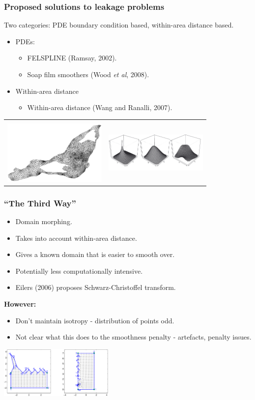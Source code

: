 \documentclass[ignorenonframetext]{beamer} %
\newcommand{\bc}{\begin{center}}
\newcommand{\ec}{\end{center}}
\newcommand{\bi}{\begin{itemize}}
\newcommand{\ei}{\end{itemize}}
\begin{document}
\begin{frame}
	\frametitle{Proposed solutions to leakage problems}
	Two categories: PDE boundary condition based, within-area distance based.
       \bi
         \item PDEs:
	  \bi
             \item FELSPLINE (Ramsay, 2002).
             \item Soap film smoothers (Wood \emph{et al}, 2008).
           \ei
           \item Within-area distance
           \bi
             \item Within-area distance (Wang and Ranalli, 2007).
           \ei
        \ei
        \bc\begin{tabular}{@{}cc}
          & \\
        \includegraphics[width=2in]{figs/ramsaytriangulation.png}&\includegraphics[width=2in]{figs/soapbases.png}\\
        \end{tabular}
        \ec
\end{frame}


\begin{frame}
	\frametitle{``The Third Way''}
      \bi
         \item Domain morphing.
         \item Takes into account within-area distance.
         \item Gives a known domain that is easier to smooth over.
         \item Potentially less computationally intensive. 
         \item Eilers (2006) proposes Schwarz-Christoffel transform.
      \ei
      \bc
         \textbf{However:}
      \ec
      \bi
         \item Don't maintain isotropy - distribution of points odd.
         \item Not clear what this does to the smoothness penalty - artefacts, penalty issues.
      \ei
      \bc
         \includegraphics[height=1in]{figs/matlab-test-3}
      \ec
\end{frame}
\end{document}
